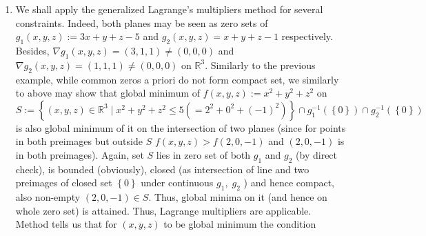 \documentclass[8pt]{article} %
\newcommand{\myset}[1]{\left\{#1\right\}}
\begin{document}
\begin{enumerate}
{\begin{enumerate}[label=(\alph*)]
{			}
		\item{We shall apply the generalized Lagrange's multipliers method for several constraints. Indeed, both planes may be seen as zero sets of $g_1(x,y,z):=
				3x+y+z-5$ and $g_2(x,y,z)=x+y+z-1$ respectively. Besides, $\nabla g_1(x,y,z)=(3,1,1)\neq (0,0,0)$ and $\nabla g_2(x,y,z)=(1,1,1)\neq (0,0,0)$
				on $\mathbb{R}^3$. 
			Similarly to the previous example, while common zeros a priori do not form compact set, we similarly to above may show that global minimum of $f(x,y,z):=
			x^2+y^2+z^2$ on $S:=\myset{(x,y,z)\in\mathbb{R}^3\mid {x^2+y^2+z^2}\leq 5(=2^2+0^2+(-1)^2)}
			\cap g_1^{-1}(\myset{0})\cap g_2^{-1}(\myset{0})
			$ is also global minimum of it on the intersection
			of two planes (since for points in both preimages but outside $S$ $f(x,y,z)>f(2,0,-1)$ and $(2,0,-1)$ is in both preimages).
			Again, set $S$ lies in zero set of both $g_1$ and $g_2$ (by direct check), is bounded
			(obviously), closed (as intersection of line and two preimages of closed set $\myset{0}$ under continuous $g_1,\;g_2$
			) and hence compact, also non-empty $(2,0,-1)\in S$. Thus, global minima on it (and
			hence on whole zero set) is attained. Thus, Lagrange multipliers are applicable. Method tells us that for $(x,y,z)$ to be global minimum the condition
}
\end{enumerate}}
\end{enumerate}
\end{document}
